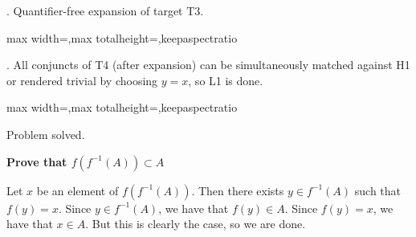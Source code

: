 \documentclass[a4paper,twoside,12pt]{article} %
\makeatletter
\DeclareRobustCommand{\_}{%
  \leavevmode\vbox{%
    \hrule\@width.4em
          \@height-.16ex
          \@depth\dimexpr.16ex+.28pt\relax}}
\newcommand\Tstrut{\rule{0pt}{2.4ex}}
\newcommand\Bstrut{\rule[-1.1ex]{0pt}{0pt}}
\newenvironment{fit}{\begin{adjustbox}{max width=\textwidth,max totalheight=\textheight,keepaspectratio}}{\end{adjustbox}}
\makeatother
\begin{document}
\begin{steps}
. Quantifier-free expansion of target T3.\nopagebreak[4] 
\nopagebreak[4] 
\smallskip\nopagebreak[4] 

\begin{fit}%
\end{fit}
\smallskip

. All conjuncts of T4 (after expansion) can be simultaneously matched against H1 or rendered trivial by choosing $y = x$, so L1 is done.\nopagebreak[4] 
\nopagebreak[4] 
\smallskip\nopagebreak[4] 

\begin{fit}%
\end{fit}

Problem solved.
\cleardoublepage

\end{steps}
{\begin{center} \large \textbf{Prove that $f(f^{-1}(A))\subset A$}\end{center}}\nopagebreak[4]

\begin{center}
\begin{minipage}{120mm}
Let $x$ be an element of $f(f^{-1}(A))$. Then there exists $y\in f^{-1}(A)$ such that $f(y) = x$. Since $y\in f^{-1}(A)$, we have that $f(y)\in A$. Since $f(y) = x$, we have that $x\in A$. But this is clearly the case, so we are done.
\end{minipage}
\end{center}
\end{document}

